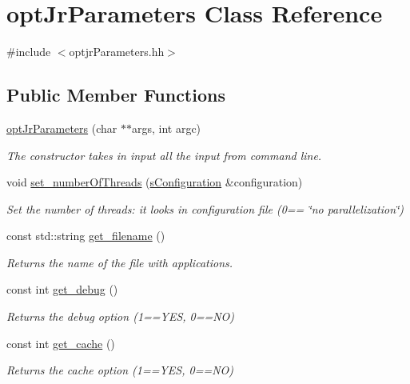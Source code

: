 \hypertarget{classoptJrParameters}{\section{opt\-Jr\-Parameters Class Reference}
\label{classoptJrParameters}
}


{\ttfamily \#include $<$optjr\-Parameters.\-hh$>$}

\subsection*{Public Member Functions}
\begin{DoxyCompactItemize}
\item 
\hyperlink{classoptJrParameters_a76f806d48141b4b4c7a215c2645011de}{opt\-Jr\-Parameters} (char $\ast$$\ast$args, int argc)
\begin{DoxyCompactList}\small\item\em The constructor takes in input all the input from command line. \end{DoxyCompactList}\item 
void \hyperlink{classoptJrParameters_a3747d78e5dd35b8b1aa1c037e9d91cf7}{set\-\_\-number\-Of\-Threads} (\hyperlink{readConfigurationFile_8hh_ab8f35b1da3261263c5e9c0e7c8921f5c}{s\-Configuration} \&configuration)
\begin{DoxyCompactList}\small\item\em Set the number of threads\-: it looks in configuration file (0== \char`\"{}no parallelization\char`\"{}) \end{DoxyCompactList}\item 
const std\-::string \hyperlink{classoptJrParameters_a8dcc738e721b3df88c2622712ed83414}{get\-\_\-filename} ()
\begin{DoxyCompactList}\small\item\em Returns the name of the file with applications. \end{DoxyCompactList}\item 
const int \hyperlink{classoptJrParameters_a64016f274261a7a7d74d8460bb7e2ee4}{get\-\_\-debug} ()
\begin{DoxyCompactList}\small\item\em Returns the debug option (1==Y\-E\-S, 0==N\-O) \end{DoxyCompactList}\item 
const int \hyperlink{classoptJrParameters_ac698812fa1177c71eb46dc61d2e5af77}{get\-\_\-cache} ()
\begin{DoxyCompactList}\small\item\em Returns the cache option (1==Y\-E\-S, 0==N\-O) \end{DoxyCompactList}\item 
$$
\end{DoxyCompactItemize}
